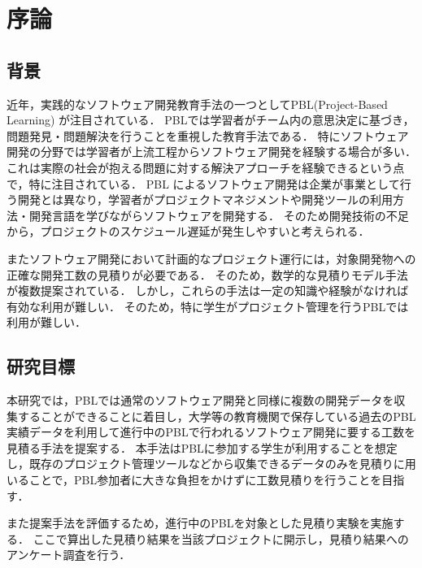 \documentclass{compsoft}
\begin{document}
\section{序論} %



\subsection{背景} \label{Background}%
近年，実践的なソフトウェア開発教育手法の一つとしてPBL(Project-Based Learning) が注目されている．
PBLでは学習者がチーム内の意思決定に基づき，問題発見・問題解決を行うことを重視した教育手法である\cite{pbl}．
特にソフトウェア開発の分野では学習者が上流工程からソフトウェア開発を経験する場合が多い．
これは実際の社会が抱える問題に対する解決アプローチを経験できるという点で，特に注目されている．
PBL によるソフトウェア開発は企業が事業として行う開発とは異なり，学習者がプロジェクトマネジメントや開発ツールの利用方法・開発言語を学びながらソフトウェアを開発する．
そのため開発技術の不足から，プロジェクトのスケジュール遅延が発生しやすいと考えられる．

またソフトウェア開発において計画的なプロジェクト運行には，対象開発物への正確な開発工数の見積りが必要である．
そのため，数学的な見積りモデル手法が複数提案されている．
しかし，これらの手法は一定の知識や経験がなければ有効な利用が難しい．
そのため，特に学生がプロジェクト管理を行うPBLでは利用が難しい．

\subsection{研究目標} \label{Parpose}
本研究では，PBLでは通常のソフトウェア開発と同様に複数の開発データを収集することができることに着目し，大学等の教育機関で保存している過去のPBL実績データを利用して進行中のPBLで行われるソフトウェア開発に要する工数を見積る手法を提案する．
本手法はPBLに参加する学生が利用することを想定し，既存のプロジェクト管理ツールなどから収集できるデータのみを見積りに用いることで，PBL参加者に大きな負担をかけずに工数見積りを行うことを目指す．

また提案手法を評価するため，進行中のPBLを対象とした見積り実験を実施する．
ここで算出した見積り結果を当該プロジェクトに開示し，見積り結果へのアンケート調査を行う．
\end{document}

